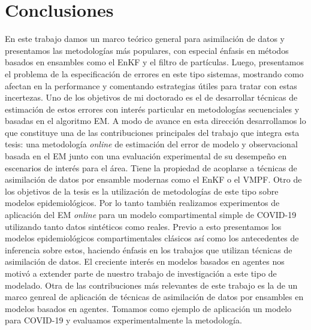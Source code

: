 \chapter{Conclusiones}

En este trabajo damos un marco teórico general para asimilación de datos y presentamos las metodologías más populares, con especial énfasis en métodos basados en ensambles como el EnKF y el filtro de partículas. Luego, presentamos el problema de la especificación de errores en este tipo sistemas, mostrando como afectan en la performance y comentando estrategias útiles para tratar con estas incertezas. Uno de los objetivos de mi doctorado es el de desarrollar técnicas de estimación de estos errores con interés particular en metodologías secuenciales y basadas en el algoritmo EM. A modo de avance en esta dirección desarrollamos lo que constituye una de las contribuciones principales del trabajo que integra esta tesis: una metodología \textit{online} de estimación del error de modelo y observacional basada en el EM junto con una evaluación experimental de su desempeño en escenarios de interés para el área. Tiene la propiedad de acoplarse a técnicas de asimilación de datos por ensamble modernas como el EnKF o el VMPF. Otro de los objetivos de la tesis es la utilización de metodologías de este tipo sobre modelos epidemiológicos. Por lo tanto también realizamos experimentos de aplicación del EM \textit{online} para un modelo compartimental simple de COVID-19 utilizando tanto datos sintéticos como reales. Previo a esto presentamos los modelos epidemiológicos compartimentales clásicos así como los antecedentes de inferencia sobre estos, haciendo énfasis en los trabajos que utilizan técnicas de asimilación de datos. El creciente interés en modelos basados en agentes nos motivó a extender parte de nuestro trabajo de investigación a este tipo de modelado. Otra de las contribuciones más relevantes de este trabajo es la de un marco genreal de aplicación de técnicas de asimilación de datos por ensambles en modelos basados en agentes. Tomamos como ejemplo de aplicación un modelo para COVID-19 y evaluamos experimentalmente la metodología.


